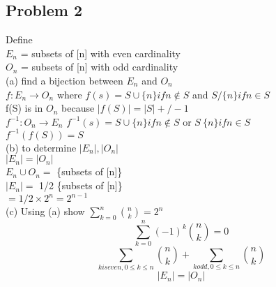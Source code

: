 \documentclass[12pt]{article}
\begin{document}
	\subsection*{Problem 2}
	Define \\
	$E_n$ = subsets of [n] with even cardinality\\
	$O_n$ = subsets of [n] with odd cardinality\\
	
	(a) find a bijection between $E_n$ and $O_n$\\
	$f: E_n \rightarrow O_n$ where $f(s) = S \cup \{n\} if n \notin S$ and $S / \{n\} if n \in S$\\
	f(S) is in $O_n$ because $|f(S)| = |S| +/- 1$\\
	$f^{-1}:O_n \rightarrow E_n$ $f^{-1}(s) = S \cup \{n\} if n \notin S$ or $S \ \{n\} if n \in S$\\
	$f^{-1}(f(S)) = S$\\
	
	(b) to determine $|E_n|, |O_n|$\\
	$|E_n| = |O_n|$\\
	$E_n \cup O_n = $ \{subsets of [n]\}\\
	$|E_n| = $ 1/2 \{subsets of [n]\}\\
	$= 1/2 \times 2^n = 2^{n-1}$\\
	
	(c) Using (a) show $\sum_{k=0}^{n}{n \choose k} = 2^n$\\
	$$\sum_{k=0}^{n}(-1)^k{n \choose k} = 0$$
	$$\sum_{k is even, 0 \leq k \leq n}{n \choose k} + \sum_{k odd, 0 \leq k \leq n}{n \choose k}$$
	$$|E_n| = |O_n|$$
	
	
	
	
\end{document}
